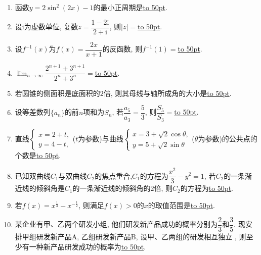 \documentclass[10pt,a4paper]{article}
\newcommand{\blank}[1]{\underline{\hbox to #1pt{}}}
\begin{document}
\begin{enumerate}[1.]
\item 函数$y=2\sin^2(2x)-1$的最小正周期是\blank{50}.
\item 设$\mathrm{i}$为虚数单位, 复数$z=\dfrac{1-2 \mathrm{i}}{2+\mathrm{i}}$, 则$|z|=$\blank{50}.
\item 设$f^{-1}(x)$为$f(x)=\dfrac{2x}{x+1}$的反函数, 则$f^{-1}(1)=$\blank{50}.
\item $\displaystyle\lim_{n\to\infty}\dfrac{2^{n+1}+3^{n+1}}{2^n+3^n}=$\blank{50}.
\item 若圆锥的侧面积是底面积的$2$倍, 则其母线与轴所成角的大小是\blank{50}.
\item 设等差数列$\{a_n\}$的前$n$项和为$S_n$, 若$\dfrac{a_5}{a_3}=\dfrac53$, 则$\dfrac{S_5}{S_3}=$\blank{50}.
\item 直线$\begin{cases} x=2+t, \\ y=4-t,\end{cases}$($t$为参数)与曲线$\begin{cases} x=3+\sqrt2\cos\theta, \\ y=5+\sqrt2\sin\theta \end{cases}$($\theta$为参数)的公共点的个数是\blank{50}.
\item 已知双曲线$C_1$与双曲线$C_2$的焦点重合,$C_1$的方程为$\dfrac{x^2}3-{y^2}=1$, 若$C_2$的一条渐近线的倾斜角是$C_1$的一条渐近线的倾斜角的$2$倍, 则$C_2$的方程为\blank{50}.
\item 若$f(x)={x^{\frac13}}-{x^{-\frac12}}$, 则满足$f(x)>0$的$x$的取值范围是\blank{50}.
\item 某企业有甲、乙两个研发小组, 他们研发新产品成功的概率分别为$\dfrac23$和$\dfrac35$. 现安排甲组研发新产品A, 乙组研发新产品B, 设甲、乙两组的研发相互独立 , 则至少有一种新产品研发成功的概率为\blank{50}.



\end{enumerate}
\end{document}
